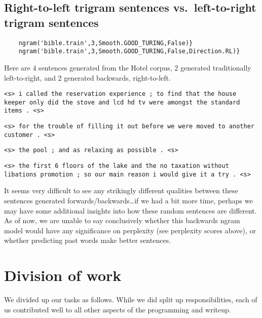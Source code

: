 \documentclass{article}
\begin{document}
\subsection{Right-to-left trigram sentences vs.\ left-to-right trigram sentences}
\begin{verbatim}
    ngram('bible.train',3,Smooth.GOOD_TURING,False)}
    ngram('bible.train',3,Smooth.GOOD_TURING,False,Direction.RL)}
\end{verbatim}

\begin{adjustwidth}{0.25in}{0.5in}
Here are 4 sentences generated from the Hotel corpus, 2 generated traditionally left-to-right, and 2 generated backwards, right-to-left.\par
{\small
\texttt{<s> i called the reservation experience ; to find that the house keeper only did the stove and lcd hd tv were amongst the standard items . <s>}\par
\texttt{<s> for the trouble of filling it out before we were moved to another customer . <s>}\par\smallskip
\texttt{<s> the pool ; and as relaxing as possible . <s>}\par
\texttt{<s> the first 6 floors of the lake and the no taxation without libations promotion ; so our main reason i would give it a try . <s>}
}
It seems very difficult to see any strikingly different qualities between these sentences generated forwards/backwards\ldots if we had a bit more time, perhaps we may have some additional insights into how these random sentences are different. As of now, we are unable to say conclusively whether this backwards ngram model would have any significance on perplexity (see perplexity scores above), or whether predicting past words make better sentences.
\end{adjustwidth}

\section{Division of work}
We divided up our tasks as follows. While we did split up responsibilities, each of us contributed well to all other aspects of the programming and writeup.
\end{document}
